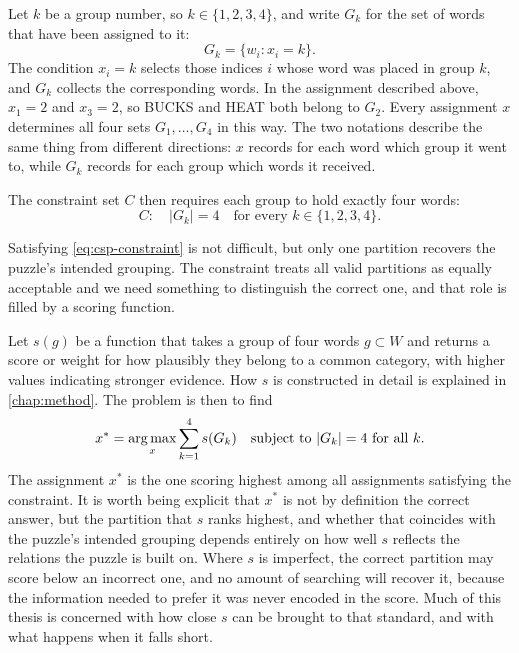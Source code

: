 Let $k$ be a group number, so $k \in \{1,2,3,4\}$, and write $G_k$ for the set of words that have been assigned to it:
\begin{equation}
G_k = \{w_i : x_i = k\}.
\label{eq:group-def}
\end{equation}
The condition $x_i = k$ selects those indices $i$ whose word was placed in group $k$, and $G_k$ collects the corresponding words. In the assignment described above, $x_1 = 2$ and $x_3 = 2$, so BUCKS and HEAT both belong to $G_2$. Every assignment $x$ determines all four sets $G_1, \dots, G_4$ in this way. The two notations describe the same thing from different directions: $x$ records for each word which group it went to, while $G_k$ records for each group which words it received.

The constraint set $C$ then requires each group to hold exactly four words:
\begin{equation}
C: \quad |G_k| = 4 \quad \text{for every } k \in \{1,2,3,4\}.
\label{eq:csp-constraint}
\end{equation}

Satisfying \autoref{eq:csp-constraint} is not difficult, but only one partition recovers the puzzle's intended grouping. The constraint treats all valid partitions as equally acceptable and we need something to distinguish the correct one, and that role is filled by a scoring function.

Let $s(g)$ be a function that takes a group of four words $g \subset W$ and returns a score or weight for how plausibly they belong to a common category, with higher values indicating stronger evidence. How $s$ is constructed in detail is explained in \autoref{chap:method}. The problem is then to find
\begin{equation}
x^* = \operatorname*{arg\,max}_x \sum_{k=1}^{4} s(G_k) \quad \text{subject to } |G_k| = 4 \text{ for all } k.
\label{eq:weighted-csp}
\end{equation}
The assignment $x^*$ is the one scoring highest among all assignments satisfying the constraint. It is worth being explicit that $x^*$ is not by definition the correct answer, but the partition that $s$ ranks highest, and whether that coincides with the puzzle's intended grouping depends entirely on how well $s$ reflects the relations the puzzle is built on. Where $s$ is imperfect, the correct partition may score below an incorrect one, and no amount of searching will recover it, because the information needed to prefer it was never encoded in the score. Much of this thesis is concerned with how close $s$ can be brought to that standard, and with what happens when it falls short.

